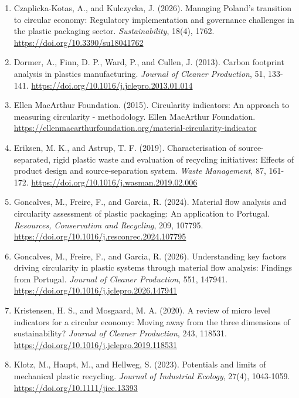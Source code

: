 \documentclass[review,10pt]{elsarticle}
\newcommand{\changepar}[1]{#1\par\medskip}
\begin{document}
\begin{enumerate}[leftmargin=*]
\item \changepar{Czaplicka-Kotas, A., and Kulczycka, J. (2026). Managing Poland's transition to circular economy: Regulatory implementation and governance challenges in the plastic packaging sector. \textit{Sustainability}, 18(4), 1762. \url{https://doi.org/10.3390/su18041762}}

\item \changepar{Dormer, A., Finn, D. P., Ward, P., and Cullen, J. (2013). Carbon footprint analysis in plastics manufacturing. \textit{Journal of Cleaner Production}, 51, 133-141. \url{https://doi.org/10.1016/j.jclepro.2013.01.014}}

\item \changepar{Ellen MacArthur Foundation. (2015). Circularity indicators: An approach to measuring circularity - methodology. Ellen MacArthur Foundation. \url{https://ellenmacarthurfoundation.org/material-circularity-indicator}}

\item \changepar{Eriksen, M. K., and Astrup, T. F. (2019). Characterisation of source-separated, rigid plastic waste and evaluation of recycling initiatives: Effects of product design and source-separation system. \textit{Waste Management}, 87, 161-172. \url{https://doi.org/10.1016/j.wasman.2019.02.006}}

\item \changepar{Goncalves, M., Freire, F., and Garcia, R. (2024). Material flow analysis and circularity assessment of plastic packaging: An application to Portugal. \textit{Resources, Conservation and Recycling}, 209, 107795. \url{https://doi.org/10.1016/j.resconrec.2024.107795}}

\item \changepar{Goncalves, M., Freire, F., and Garcia, R. (2026). Understanding key factors driving circularity in plastic systems through material flow analysis: Findings from Portugal. \textit{Journal of Cleaner Production}, 551, 147941. \url{https://doi.org/10.1016/j.jclepro.2026.147941}}

\item \changepar{Kristensen, H. S., and Mosgaard, M. A. (2020). A review of micro level indicators for a circular economy: Moving away from the three dimensions of sustainability? \textit{Journal of Cleaner Production}, 243, 118531. \url{https://doi.org/10.1016/j.jclepro.2019.118531}}

\item \changepar{Klotz, M., Haupt, M., and Hellweg, S. (2023). Potentials and limits of mechanical plastic recycling. \textit{Journal of Industrial Ecology}, 27(4), 1043-1059. \url{https://doi.org/10.1111/jiec.13393}}


\end{enumerate}
\end{document}

